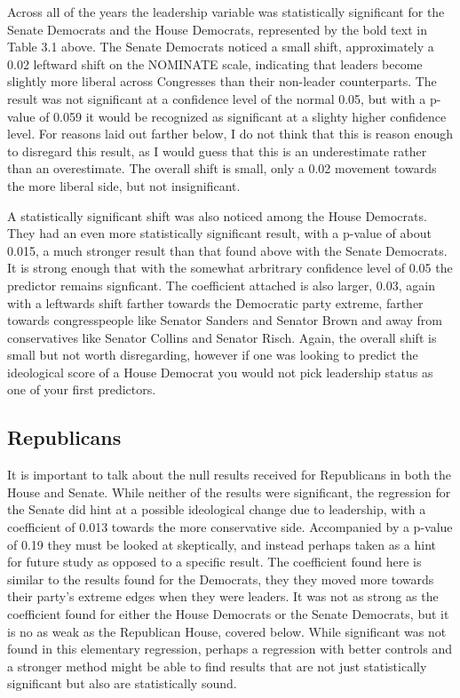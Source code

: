 \documentclass[12pt,twoside]{reedthesis}
\begin{document}
  Across all of the years the leadership variable was statistically
  significant for the Senate Democrats and the House Democrats,
  represented by the bold text in Table 3.1 above. The Senate Democrats
  noticed a small shift, approximately a 0.02 leftward shift on the
  NOMINATE scale, indicating that leaders become slightly more liberal
  across Congresses than their non-leader counterparts. The result was not
  significant at a confidence level of the normal 0.05, but with a p-value
  of 0.059 it would be recognized as significant at a slighty higher
  confidence level. For reasons laid out farther below, I do not think
  that this is reason enough to disregard this result, as I would guess
  that this is an underestimate rather than an overestimate. The overall
  shift is small, only a 0.02 movement towards the more liberal side, but
  not insignificant.
  
  A statistically significant shift was also noticed among the House
  Democrats. They had an even more statistically significant result, with
  a p-value of about 0.015, a much stronger result than that found above
  with the Senate Democrats. It is strong enough that with the somewhat
  arbritrary confidence level of 0.05 the predictor remains signficant.
  The coefficient attached is also larger, 0.03, again with a leftwards
  shift farther towards the Democratic party extreme, farther towards
  congresspeople like Senator Sanders and Senator Brown and away from
  conservatives like Senator Collins and Senator Risch. Again, the overall
  shift is small but not worth disregarding, however if one was looking to
  predict the ideological score of a House Democrat you would not pick
  leadership status as one of your first predictors.
  
  \subsection{Republicans}\label{republicans}
  
  It is important to talk about the null results received for Republicans
  in both the House and Senate. While neither of the results were
  significant, the regression for the Senate did hint at a possible
  ideological change due to leadership, with a coefficient of 0.013
  towards the more conservative side. Accompanied by a p-value of 0.19
  they must be looked at skeptically, and instead perhaps taken as a hint
  for future study as opposed to a specific result. The coefficient found
  here is similar to the results found for the Democrats, they they moved
  more towards their party's extreme edges when they were leaders. It was
  not as strong as the coefficient found for either the House Democrats or
  the Senate Democrats, but it is no as weak as the Republican House,
  covered below. While significant was not found in this elementary
  regression, perhaps a regression with better controls and a stronger
  method might be able to find results that are not just statistically
  significant but also are statistically sound.
  
\end{document}
